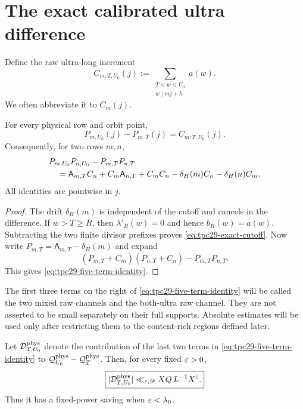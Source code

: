 \section{The exact calibrated ultra difference}
\label{sec:tpc29-calibrated-difference}

Define the raw ultra-long increment
\begin{equation}
 C_{m;T,U_0}(j)
 :=\sum_{\substack{T<w\le U_0\\w\mid mj+h}}a(w).
 \label{eq:tpc29-ultra-increment}
\end{equation}
We often abbreviate it to $C_m(j)$.

\begin{proposition}
\label{prop:tpc29-exact-cutoff}
For every physical row and orbit point,
\begin{equation}
 \boxed{P_{m,U_0}(j)-P_{m,T}(j)=C_{m;T,U_0}(j).}
 \label{eq:tpc29-exact-cutoff}
\end{equation}
Consequently, for two rows $m,n$,
\begin{align}
 &P_{m,U_0}P_{n,U_0}-P_{m,T}P_{n,T}
 \notag\\
 &\quad=
 \mathsf A_{m,T}C_n+C_m\mathsf A_{n,T}+C_mC_n
 -\delta_H(m)C_n-\delta_H(n)C_m.
 \label{eq:tpc29-five-term-identity}
\end{align}
All identities are pointwise in $j$.
\end{proposition}

\begin{proof}
The drift $\delta_H(m)$ is independent of the cutoff and cancels in
the difference.  If $w>T\ge R$, then $\lambda'_R(w)=0$ and hence
$b_R(w)=a(w)$.  Subtracting the two finite divisor prefixes proves
\eqref{eq:tpc29-exact-cutoff}.  Now write
$P_{m,T}=\mathsf A_{m,T}-\delta_H(m)$ and expand
\[
 (P_{m,T}+C_m)(P_{n,T}+C_n)-P_{m,T}P_{n,T}.
\]
This gives \eqref{eq:tpc29-five-term-identity}.
\end{proof}

The first three terms on the right of
\eqref{eq:tpc29-five-term-identity} will be called the two mixed raw
channels and the both-ultra raw channel.  They are not asserted to be
small separately on their full supports.  Absolute estimates will be
used only after restricting them to the content-rich regions defined
later.

\begin{proposition}
\label{prop:tpc29-drift-small}
Let $\mathcal D_{T,U_0}^{\rm phys}$ denote the contribution of the last two
terms in \eqref{eq:tpc29-five-term-identity} to
$\mathcal Q_{U_0}^{\rm phys}-\mathcal Q_T^{\rm phys}$.  Then, for every fixed
$\varepsilon>0$,
\begin{equation}
 \boxed{
 |\mathcal D_{T,U_0}^{\rm phys}|
 \ll_{\varepsilon,\mathscr D}XQ\,L^{-1}X^\varepsilon.}
 \label{eq:tpc29-drift-small}
\end{equation}
Thus it has a fixed-power saving when $\varepsilon<\lambda_0$.
\end{proposition}

